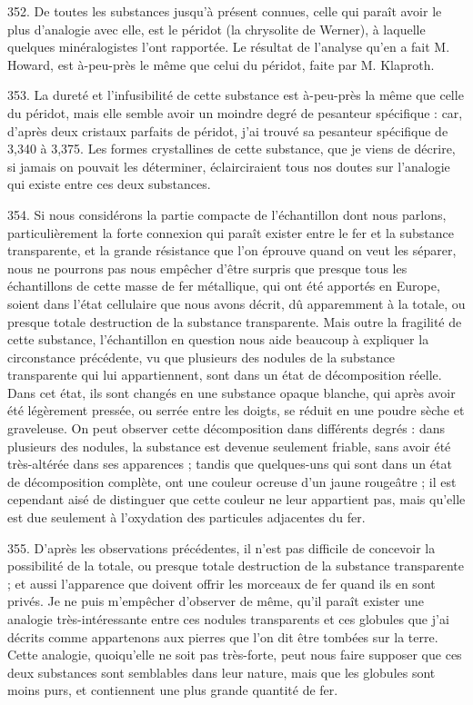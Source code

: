 \documentclass[a4paper, 11pt, oneside, polutonikogreek, french]{article}
\begin{document}
352. De toutes les substances jusqu'à présent connues, celle qui paraît avoir le plus d'analogie avec elle, est le péridot (la chrysolite de Werner), à laquelle quelques minéralogistes l'ont rapportée. Le résultat de l'analyse qu'en a fait M. Howard, est à-peu-près le même que celui du péridot, faite par M. Klaproth.

353. La dureté et l'infusibilité de cette substance est à-peu-près la même que celle du péridot, mais elle semble avoir un moindre degré de pesanteur spécifique : car, d'après deux cristaux parfaits de péridot, j'ai trouvé sa pesanteur spécifique de 3,340 à 3,375. Les formes crystallines de cette substance, que je viens de décrire, si jamais on pouvait les déterminer, éclairciraient tous nos doutes sur l'analogie qui existe entre ces deux substances.

354. Si nous considérons la partie compacte de l'échantillon dont nous parlons, particulièrement la forte connexion qui paraît exister entre le fer et la substance transparente, et la grande résistance que l'on éprouve quand on veut les séparer, nous ne pourrons pas nous empêcher d'être surpris que presque tous les échantillons de cette masse de fer métallique, qui ont été apportés en Europe, soient dans l'état cellulaire que nous avons décrit, dû apparemment à la totale, ou presque totale destruction de la substance transparente. Mais outre la fragilité de cette substance, l'échantillon en question nous aide beaucoup à expliquer la circonstance précédente, vu que plusieurs des nodules de la substance transparente qui lui appartiennent, sont dans un état de décomposition réelle. Dans cet état, ils sont changés en une substance opaque blanche, qui après avoir été légèrement pressée, ou serrée entre les doigts, se réduit en une poudre sèche et graveleuse. On peut observer cette décomposition dans différents degrés : dans plusieurs des nodules, la substance est devenue seulement friable, sans avoir été très-altérée dans ses apparences ; tandis que quelques-uns qui sont dans un état de décomposition complète, ont une couleur ocreuse d'un jaune rougeâtre ; il est cependant aisé de distinguer que cette couleur ne leur appartient pas, mais qu'elle est due seulement à l'oxydation des particules adjacentes du fer.

355. D'après les observations précédentes, il n'est pas difficile de concevoir la possibilité de la totale, ou presque totale destruction de la substance transparente ; et aussi l'apparence que doivent offrir les morceaux de fer quand ils en sont privés. Je ne puis m'empêcher d'observer de même, qu'il paraît exister une analogie très-intéressante entre ces nodules transparents et ces globules que j'ai décrits comme appartenons aux pierres que l'on dit être tombées sur la terre. Cette analogie, quoiqu'elle ne soit pas très-forte, peut nous faire supposer que ces deux substances sont semblables dans leur nature, mais que les globules sont moins purs, et contiennent une plus grande quantité de fer.
\end{document}
